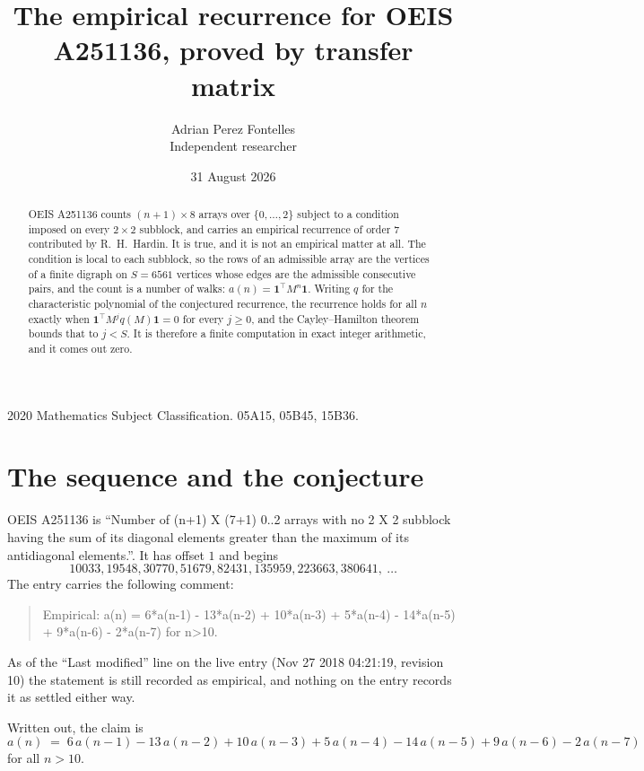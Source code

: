 \documentclass[11pt,a4paper]{article}
\title{The empirical recurrence for OEIS A251136, proved by transfer matrix}
\author{Adrian Perez Fontelles\\ \small Independent researcher}
\date{31 August 2026}
\theoremstyle{plain}
\theoremstyle{definition}
\begin{document}
\maketitle

\begin{abstract}
OEIS A251136 counts $(n+1)\times8$ arrays over $\{0,\dots,2\}$ subject to a condition imposed on
every $2\times2$ subblock, and carries an empirical recurrence of order $7$ contributed
by R.~H.~Hardin. It is true, and it is not an empirical matter at all. The condition is local
to each subblock, so the rows of an admissible array are the vertices of a finite digraph
on $S=6561$ vertices whose edges are the admissible consecutive pairs, and the count is a
number of walks: $a(n)=\mathbf{1}^{\!\top}M^{n}\mathbf{1}$. Writing $q$
for the characteristic polynomial of the conjectured recurrence, the recurrence holds for all
$n$ exactly when $\mathbf{1}^{\!\top}M^{j}q(M)\mathbf{1}=0$ for every $j\ge0$, and the
Cayley--Hamilton theorem bounds that to $j<S$. It is therefore a finite computation in exact
integer arithmetic, and it comes out zero.
\end{abstract}

\noindent\small 2020 Mathematics Subject Classification. 05A15, 05B45, 15B36.\normalsize

\section{The sequence and the conjecture}

OEIS A251136 is ``Number of (n+1) X (7+1) 0..2 arrays with no 2 X 2 subblock having the sum of its diagonal elements greater than the maximum of its antidiagonal elements.''. It has offset $1$ and begins
\[
10033, 19548, 30770, 51679, 82431, 135959, 223663, 380641,\ \dots
\]
The entry carries the following comment:
\begin{quote}\small
Empirical: a(n) = 6*a(n-1) - 13*a(n-2) + 10*a(n-3) + 5*a(n-4) - 14*a(n-5) + 9*a(n-6) - 2*a(n-7) for n>10.
\end{quote}
As of the ``Last modified'' line on the live entry (Nov 27 2018 04:21:19, revision 10) the statement is
still recorded as empirical, and nothing on the entry records it as settled either way.

Written out, the claim is
\begin{equation}\label{eq:conj}
a(n)\;=\;6\,a(n-1) - 13\,a(n-2) + 10\,a(n-3) + 5\,a(n-4) - 14\,a(n-5) + 9\,a(n-6) - 2\,a(n-7)
\end{equation}
for all $n>10$.
\end{document}
